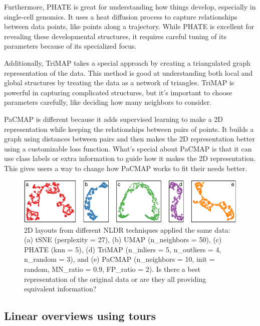 \documentclass[
  12pt]{article}
\begin{document}
Furthermore, PHATE \citep{article03} is great for understanding how
things develop, especially in single-cell genomics. It uses a heat
diffusion process to capture relationships between data points, like
points along a trajectory. While PHATE is excellent for revealing these
developmental structures, it requires careful tuning of its parameters
because of its specialized focus.

Additionally, TriMAP \citep{article02} takes a special approach by
creating a triangulated graph representation of the data. This method is
good at understanding both local and global structures by treating the
data as a network of triangles. TriMAP is powerful in capturing
complicated structures, but it's important to choose parameters
carefully, like deciding how many neighbors to consider.

PaCMAP \citep{Yingfan2021} is different because it adds supervised
learning to make a 2D representation while keeping the relationships
between pairs of points. It builds a graph using distances between pairs
and then makes the 2D representation better using a customizable loss
function. What's special about PaCMAP is that it can use class labels or
extra information to guide how it makes the 2D representation. This
gives users a way to change how PaCMAP works to fit their needs better.

\begin{figure}

{\centering \includegraphics[width=1\textwidth,height=\textheight]{paper_files/figure-pdf/fig-nldervis-1.pdf}

}

\caption{\label{fig-nldervis}2D layouts from different NLDR techniques
applied the same data: (a) tSNE (perplexity = 27), (b) UMAP
(n\_neighbors = 50), (c) PHATE (knn = 5), (d) TriMAP (n\_inliers = 5,
n\_outliers = 4, n\_random = 3), and (e) PaCMAP (n\_neighbors = 10, init
= random, MN\_ratio = 0.9, FP\_ratio = 2). Is there a best
representation of the original data or are they all providing equivalent
information?}

\end{figure}

\hypertarget{linear-overviews-using-tours}{%
\subsection{Linear overviews using
tours}\label{linear-overviews-using-tours}}
\end{document}
